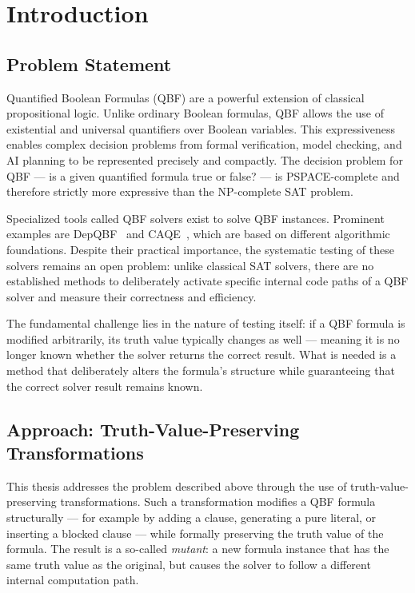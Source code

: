 \chapter{Introduction}\label{cha:introduction}

\section{Problem Statement}\label{sec:problem}

Quantified Boolean Formulas (QBF) are a powerful extension of classical propositional logic. Unlike ordinary Boolean formulas, QBF allows the use of existential and universal quantifiers over Boolean variables. This expressiveness enables complex decision problems from formal verification, model checking, and AI planning to be represented precisely and compactly. The decision problem for QBF --- is a given quantified formula true or false? --- is PSPACE-complete and therefore strictly more expressive than the NP-complete SAT problem.

Specialized tools called QBF solvers exist to solve QBF instances. Prominent examples are DepQBF~\cite{LonsingBiere2010} and CAQE~\cite{RabeTentrup2015}, which are based on different algorithmic foundations. Despite their practical importance, the systematic testing of these solvers remains an open problem: unlike classical SAT solvers, there are no established methods to deliberately activate specific internal code paths of a QBF solver and measure their correctness and efficiency.

The fundamental challenge lies in the nature of testing itself: if a QBF formula is modified arbitrarily, its truth value typically changes as well --- meaning it is no longer known whether the solver returns the correct result. What is needed is a method that deliberately alters the formula's structure while guaranteeing that the correct solver result remains known.

\section{Approach: Truth-Value-Preserving Transformations}\label{sec:approach}

This thesis addresses the problem described above through the use of truth-value-preserving transformations. Such a transformation modifies a QBF formula structurally --- for example by adding a clause, generating a pure literal, or inserting a blocked clause --- while formally preserving the truth value of the formula. The result is a so-called \emph{mutant}: a new formula instance that has the same truth value as the original, but causes the solver to follow a different internal computation path.

